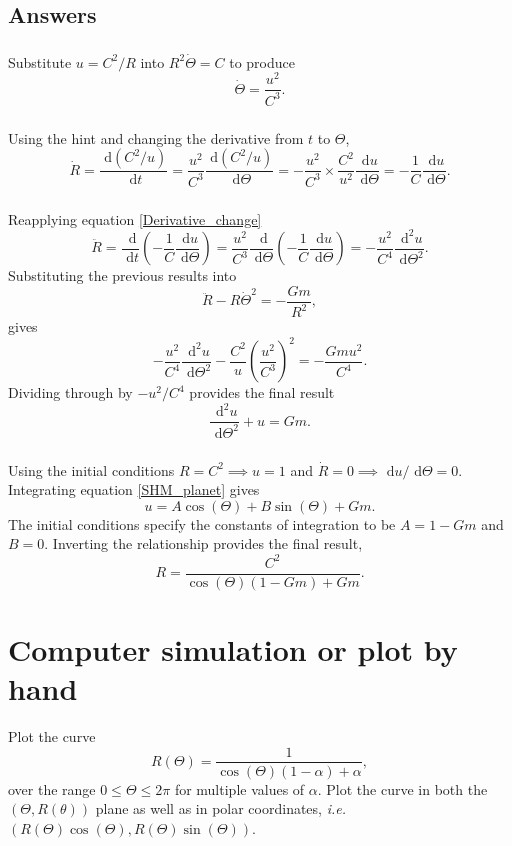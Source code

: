 \documentclass[]{article}
\newcommand{\bb}{\begin{equation}}
\newcommand{\ee}{\end{equation}}
\newcommand{\rd}{\text{ d}}
\newcommand{\eqn}[1]{equation \eqref{#1}}
\newcommand{\ie}{\emph{i.e.} }
\renewcommand{\l}{\left(}
\renewcommand{\r}{\right)}
\begin{document}
\begin{Answ}
\subsection{Answers}
\subsubsection{}
Substitute $u=C^2/R$ into $R^2\dot{\Theta}=C$ to produce
\bb
\dot{\Theta}=\frac{u^2}{C^3}.
\ee
\subsubsection{}
Using the hint and changing the derivative from $t$ to $\Theta$,
\bb
\dot{R}=\frac{\rd \l C^2/u\r}{\rd t}=\frac{u^2}{C^3}\frac{\rd \l C^2/u\r}{\rd \Theta}=-\frac{u^2}{C^3}\times\frac{C^2}{u^2}\frac{\rd u}{\rd \Theta}=-\frac{1}{C}\frac{\rd u}{\rd \Theta}.
\ee
\subsubsection{}
Reapplying \eqn{Derivative_change}
\bb
\ddot{R}=\frac{\rd}{\rd t}\l -\frac{1}{C}\frac{\rd u}{\rd \Theta} \r=\frac{u^2}{C^3}\frac{\rd}{\rd \Theta}\l -\frac{1}{C}\frac{\rd u}{\rd \Theta} \r=-\frac{u^2}{C^4}\frac{\rd^2 u}{\rd \Theta^2}.
\ee
Substituting the previous results into
\bb
\ddot{R}-R\dot{\Theta}^2=-\frac{Gm}{R^2},
\ee
gives
\bb
-\frac{u^2}{C^4}\frac{\rd^2 u}{\rd \Theta^2}-\frac{C^2}{u}\l\frac{u^2}{C^3}\r^2=-\frac{Gmu^2}{C^4}.
\ee
Dividing through by $-u^2/C^4$ provides the final result
\bb
\frac{\rd^2 u}{\rd \Theta^2}+u=Gm.
\ee
\subsubsection{}
Using the initial conditions $R=C^2 \implies u=1$ and $\dot{R}=0\implies \rd u/\rd \Theta=0$. Integrating \eqn{SHM_planet} gives
\bb
u=A\cos(\Theta)+B\sin(\Theta)+Gm.
\ee
The initial conditions specify the constants of integration to be $A=1-Gm$ and $B=0$. Inverting the relationship provides the final result,
\bb
R=\frac{C^2}{\cos(\Theta)(1-Gm)+Gm}.
\ee
\end{Answ}
\section{Computer simulation or plot by hand}
Plot the curve
\bb
R(\Theta)=\frac{1}{\cos(\Theta)(1-\alpha)+\alpha},\label{Radius}
\ee
over the range $0\leq \Theta\leq 2\pi$ for multiple values of $\alpha$. Plot the curve in both the $(\Theta,R(\theta))$ plane as well as in polar coordinates, \ie $(R(\Theta)\cos(\Theta),R(\Theta)\sin(\Theta))$.
\end{document}
